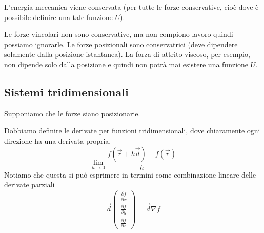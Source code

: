 \documentclass[a4paper]{article}
\begin{document}
L'energia meccanica viene conservata (per tutte le forze conservative, cioè dove è possibile
definire una tale funzione \(U\)).

Le forze vincolari non sono conservative, ma non compiono lavoro quindi possiamo ignorarle.
Le forze posizionali sono conservatrici (deve dipendere solamente dalla posizione istantanea).
La forza di attrito viscoso, per esempio, non dipende solo dalla posizione e quindi non potrà mai esistere
una funzione \(U\).

\pagebreak

\subsection{Sistemi tridimensionali}

Supponiamo che le forze siano posizionarie.

Dobbiamo definire le derivate per funzioni tridimensionali, dove chiaramente
ogni direzione ha una derivata propria.
\[
    \lim_{h \to 0} \frac{f(\vec{r} + h\vec{d}) - f(\vec{r})}{h}
\]
Notiamo che
questa si può esprimere in termini come combinazione lineare delle derivate parziali
\[
    \vec{d} \begin{pmatrix}
        \frac{\partial f}{\partial x} \\
        \frac{\partial f}{\partial y} \\
        \frac{\partial f}{\partial z}
    \end{pmatrix}
    = \vec{d} \nabla f
\]

\end{document}
